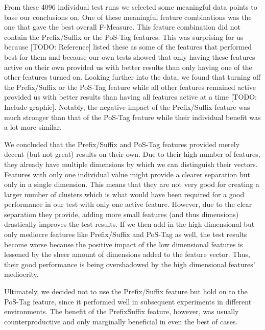 From these 4096 individual test runs we selected some meaningful data points to base our conclusions on.
One of these meaningful feature combinations was the one that gave the best overall F-Measure.
This feature combination did not contain the Prefix/Suffix or the PoS-Tag features.
This was surprising for us because [TODO: Reference] listed these as some of the features that performed best for them and because our own tests showed that only having these features active on their own provided us with better results than only having one of the other features turned on.
Looking further into the data, we found that turning off the Prefix/Suffix or the PoS-Tag feature while all other features remained active provided us with better results than having all features active at a time [TODO: Include graphic].
Notably, the negative impact of the Prefix/Suffix feature was much stronger than that of the PoS-Tag feature while their individual benefit was a lot more similar.


We concluded that the Prefix/Suffix and PoS-Tag features provided merely decent (but not great) results on their own.
Due to their high number of features, they already have multiple dimensions by which we can distinguish their vectors.
Features with only one individual value might provide a clearer separation but only in a single dimension.
This means that they are not very good for creating a larger number of clusters which is what would have been required for a good performance in our test with only one active feature.
However, due to the clear separation they provide, adding more small features (and thus dimensions) drastically improves the test results.
If we then add in the high dimensional but only mediocre features like Prefix/Suffix and PoS-Tag as well, the test results become worse because the positive impact of the low dimensional features is lessened by the sheer amount of dimensions added to the feature vector.
Thus, their good performance is being overshadowed by the high dimensional features' mediocrity.


Ultimately, we decided not to use the Prefix/Suffix feature but hold on to the PoS-Tag feature, since it performed well in subsequent experiments in different environments.
The benefit of the PrefixSuffix feature, however, was usually counterproductive and only marginally beneficial in even the best of cases.

